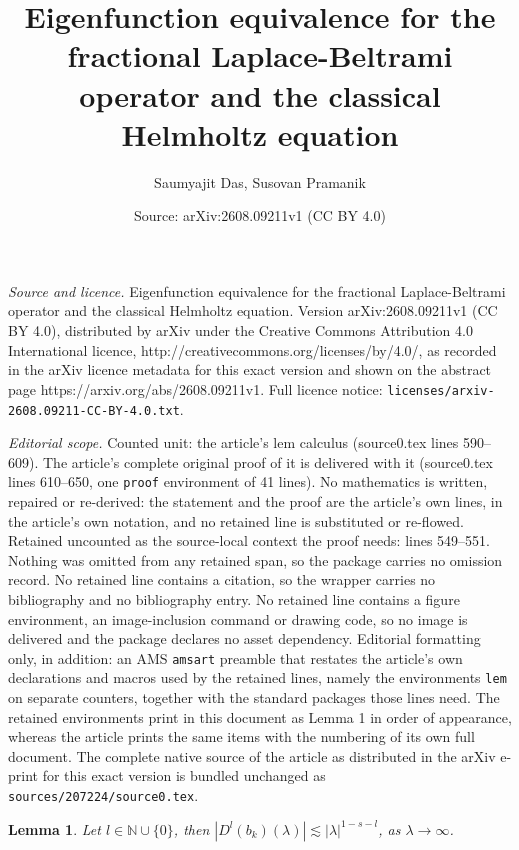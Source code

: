 \documentclass[10pt,a4paper]{amsart}
\title{Eigenfunction equivalence for the fractional Laplace-Beltrami operator and the classical Helmholtz equation}
\author{Saumyajit Das, Susovan Pramanik}
\date{Source: arXiv:2608.09211v1 (CC BY 4.0)}
\newtheorem{lem}{Lemma}
\begin{document}
\maketitle

\noindent\emph{Source and licence.} Eigenfunction equivalence for the fractional Laplace-Beltrami operator and the classical Helmholtz equation. Version arXiv:2608.09211v1 (CC BY 4.0), distributed by arXiv under the Creative Commons Attribution 4.0 International licence, http://creativecommons.org/licenses/by/4.0/, as recorded in the arXiv licence metadata for this exact version and shown on the abstract page https://arxiv.org/abs/2608.09211v1. Full licence notice: \texttt{licenses/arxiv-2608.09211-CC-BY-4.0.txt}.\par\smallskip

\noindent\textit{Editorial scope.} Counted unit: the article's lem calculus (source0.tex lines 590--609). The article's complete original proof of it is delivered with it (source0.tex lines 610--650, one \texttt{proof} environment of 41 lines). No mathematics is written, repaired or re-derived: the statement and the proof are the article's own lines, in the article's own notation, and no retained line is substituted or re-flowed.  Retained uncounted as the source-local context the proof needs: lines 549--551.  Nothing was omitted from any retained span, so the package carries no omission record.  No retained line contains a citation, so the wrapper carries no bibliography and no bibliography entry.  No retained line contains a figure environment, an image-inclusion command or drawing code, so no image is delivered and the package declares no asset dependency.  Editorial formatting only, in addition: an AMS \texttt{amsart} preamble that restates the article's own declarations and macros used by the retained lines, namely the environments \texttt{lem} on separate counters, together with the standard packages those lines need.  The retained environments print in this document as Lemma 1 in order of appearance, whereas the article prints the same items with the numbering of its own full document.  The complete native source of the article as distributed in the arXiv e-print for this exact version is bundled unchanged as \texttt{sources/207224/source0.tex}.
	\begin{lem}\label{decay of derivatives}
		Let $l\in\mathbb{N}\cup\{0\}$, then $\displaystyle{\left|D^l(b_k)(\lambda)\right|\lesssim |\lambda|^{1-s-l}}$, as $\lambda\to\infty$.
	\end{lem}
\end{document}
